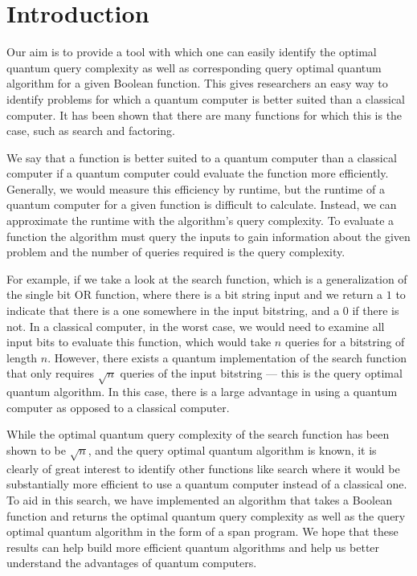 \section{Introduction}

Our aim is to provide a tool with which one can easily identify 
the optimal quantum query complexity as well as corresponding 
query optimal quantum algorithm for a given Boolean function. This
gives researchers an easy 
way to identify problems for which a quantum computer 
is better suited than a classical computer. It has been shown that
there are many functions for which this is the case, such as
search and factoring.

We say that a function is better suited to a quantum computer than a classical computer if a quantum computer could evaluate the function more efficiently. Generally, we would measure this efficiency by runtime, but the runtime of a quantum computer for a given function is difficult to calculate. Instead, we can approximate the runtime with the algorithm's query complexity. To evaluate a function the algorithm must query the inputs to gain information about the given problem and the number of queries required is the query complexity.

For example, if we take a look at the search function, which is a generalization of the single bit OR function, where there is a bit string input and we return a $1$ to indicate that there is a one somewhere in the input bitstring, and a $0$ if there is not. In a classical computer, in the worst case, we would need to examine all input bits to evaluate this function, which would take $n$ queries for a bitstring of length $n$. However, there exists a quantum implementation of the search function that only requires $\sqrt{n}$ queries of the input bitstring \cite{grover1996fast}--- this is the query optimal quantum algorithm. In this case, there is a large advantage in using a quantum computer as opposed to a classical computer. 

While the optimal quantum query complexity of the search function has been shown to be $\sqrt{n}$, and the query optimal quantum algorithm is known, it is clearly of great interest to identify other functions like search where it would be substantially more efficient to use a quantum computer instead of a classical one. To aid in this search, we have implemented an algorithm that takes a Boolean function and returns the optimal quantum query complexity as well as the query optimal quantum algorithm in the form of a span program. We hope that these results can help build more efficient quantum algorithms and help us better understand the advantages of quantum computers.

